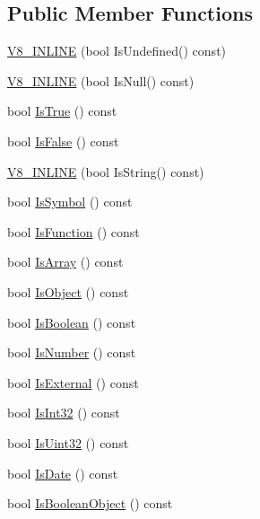 \subsection*{Public Member Functions}
\begin{DoxyCompactItemize}
\item 
\hyperlink{classv8_1_1_value_ab7fe6f0f40ad56063af2b549d9c16938}{V8\+\_\+\+I\+N\+L\+I\+N\+E} (bool Is\+Undefined() const)
\item 
\hyperlink{classv8_1_1_value_a19bb214761816faf8b2784e4d78c9f21}{V8\+\_\+\+I\+N\+L\+I\+N\+E} (bool Is\+Null() const)
\item 
bool \hyperlink{classv8_1_1_value_a8f27462322186b295195eecb3e81d6d7}{Is\+True} () const 
\item 
bool \hyperlink{classv8_1_1_value_a68c0296071d01ca899825d7643cf495a}{Is\+False} () const 
\item 
\hyperlink{classv8_1_1_value_a14bd69255a9fd04fa641713188814958}{V8\+\_\+\+I\+N\+L\+I\+N\+E} (bool Is\+String() const)
\item 
bool \hyperlink{classv8_1_1_value_af3e6081c22d09a7bbc0a2aff59ed60a5}{Is\+Symbol} () const 
\item 
bool \hyperlink{classv8_1_1_value_a05532a34cdd215f273163830ed8b77e7}{Is\+Function} () const 
\item 
bool \hyperlink{classv8_1_1_value_aaee0b144087d20eae02314c9393ff80f}{Is\+Array} () const 
\item 
bool \hyperlink{classv8_1_1_value_a355b7991c5c978c0341f6f961b63c5a2}{Is\+Object} () const 
\item 
bool \hyperlink{classv8_1_1_value_a0aceb7645e71b096df5cd73d1252b1b0}{Is\+Boolean} () const 
\item 
bool \hyperlink{classv8_1_1_value_a1bd51e3e55f67c65b9a8f587fbffb7c7}{Is\+Number} () const 
\item 
bool \hyperlink{classv8_1_1_value_a7ac61a325c18af8dcb6d7d5bf47d2503}{Is\+External} () const 
\item 
bool \hyperlink{classv8_1_1_value_a01e1db51c65b2feace248b7acbf71a2c}{Is\+Int32} () const 
\item 
bool \hyperlink{classv8_1_1_value_a783c89631bac4ef3c4b909f40cc2b8d8}{Is\+Uint32} () const 
\item 
bool \hyperlink{classv8_1_1_value_a8bc11fab0aded4a805722ab6df173cae}{Is\+Date} () const 
\item 
bool \hyperlink{classv8_1_1_value_abe7bc06283e5e66013f2f056a943168b}{Is\+Boolean\+Object} () const 
\item 

\end{DoxyCompactItemize}
